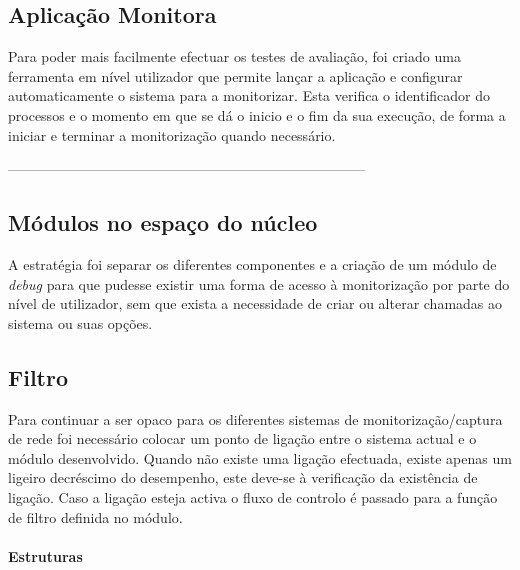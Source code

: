 \subsection{Aplicação Monitora}
\label{sub:monitor_app}

Para poder mais facilmente efectuar os testes de avaliação, foi criado uma ferramenta em nível utilizador que permite lançar a aplicação e configurar automaticamente o sistema para a monitorizar. Esta verifica o identificador do processos e o momento em que se dá o inicio e o fim da sua execução, de forma a iniciar e terminar a monitorização quando necessário.



-----------------------------------------------------------------------------



\subsection{Módulos no espaço do núcleo}
A estratégia foi separar os diferentes componentes e a criação de um módulo de \textit{debug} para que pudesse existir uma forma de acesso à monitorização por parte do nível de utilizador, sem que exista a necessidade de criar ou alterar chamadas ao sistema ou suas opções.

\subsection{Filtro}

Para continuar a ser opaco para os diferentes sistemas de monitorização/captura de rede foi necessário colocar um ponto de ligação entre o sistema actual e o módulo desenvolvido. Quando não existe uma ligação efectuada, existe apenas um ligeiro decréscimo do desempenho, este deve-se à verificação da existência de ligação. Caso a ligação esteja activa o fluxo de controlo é passado para a função de filtro definida no módulo.


\paragraph{Estruturas}

